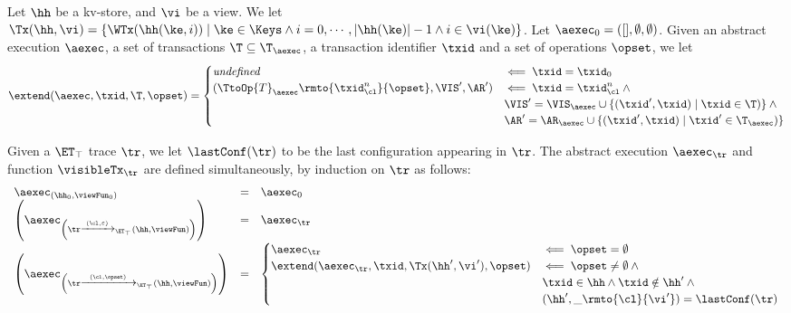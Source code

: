 \begin{definition}
\label{def:kvtrace2aexec}
Let $\hh$ be a kv-store, and $\vi$ be a view. We let $\Tx(\hh, \vi) = \{ \WTx(\hh(\ke, i)) \mid \ke \in \Keys \wedge 
i = 0,\cdots, \lvert \hh(\ke) \rvert - 1 \wedge i \in \vi(\ke) \}$. 
Let $\aexec_0 = ( [ ], \emptyset, \emptyset)$. Given an abstract execution $\aexec$, a set of transactions  
$\T \subseteq \T_{\aexec}$, a transaction identifier $\txid$ and a set of operations $\opset$, we let 
\[
\extend(\aexec, \txid, \T, \opset) = 
\begin{cases}
\textit{undefined} &\impliedby \txid = \txid_{0}\\
(\TtoOp{T}_{\aexec}\rmto{\txid_{\cl}^{n}}{\opset}, \VIS', \AR') & \impliedby \txid = \txid_{\cl}^{n} \wedge {}\\
& \VIS' = \VIS_{\aexec} \cup \{(\txid', \txid) \mid \txid \in \T)\} \wedge {}\\
& \AR' = \AR_{\aexec} \cup \{(\txid', \txid) \mid \txid' \in \T_{\aexec})\}\\
\end{cases}
\]

Given a $\ET_{\top}$ trace $\tr$, we let $\lastConf(\tr)$ to be the last configuration appearing in 
$\tr$. The abstract execution $\aexec_{\tr}$ and function $\visibleTx_{\tr}$ are defined 
simultaneously, by induction on $\tr$ as follows:
\[
\begin{array}{lcl}
\aexec_{(\hh_0, \viewFun_0)} &=& \aexec_0\\
\left(\aexec_{\left(\tr \xrightarrow{(\cl, \varepsilon)}_{\ET_{\top}} (\hh, \viewFun)\right)}\right) &=& 
\aexec_{\tr}\\
\left(\aexec_{\left(\tr \xrightarrow{(\cl, \opset)}_{\ET_{\top}} (\hh, \viewFun)\right)}\right) &=& 
\begin{cases}
\aexec_{\tr} &\impliedby \opset = \emptyset\\
\extend(\aexec_{\tr}, \txid, \Tx(\hh', \vi'), \opset) &\impliedby \opset \neq \emptyset \wedge {}\\
& \txid \in \hh \wedge \txid \notin \hh' \wedge{}\\
& (\hh', \_\rmto{\cl}{\vi'}) = \lastConf(\tr)
\end{cases}
\end{array}
\]

\end{definition}

